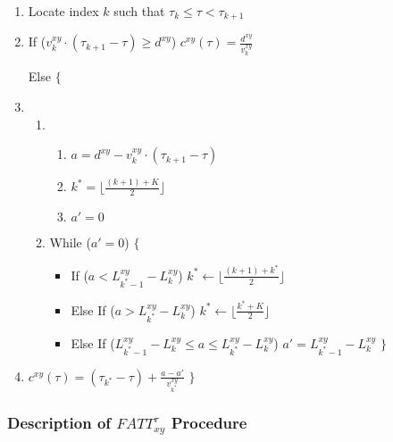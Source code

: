\documentclass[conference]{IEEEtran}
\begin{document}
\begin{enumerate}
    \item Locate index $k$ such that $\tau_k \leq \tau < \tau_{k+1}$ \label{fattindex}
    \item If ($v_k^{xy}\cdot(\tau_{k+1}-\tau)\geq d^{xy}$) $c^{xy}(\tau)=\frac{d^{xy}}{v_k^{xy}}$

    Else $\{$
    \item
    \begin{enumerate}
        \item 
        \begin{enumerate}
            \item $a=d^{xy}-v_k^{xy}\cdot(\tau_{k+1}-\tau)$
            \item $k^*= \lfloor \frac{(k+1)+K}{2} \rfloor$
            \item $a'=0$
        \end{enumerate} 
        \item While ($a'=0$) $\{$  \label{fattwhile}
        \begin{itemize}
            \item If ($a< L_{k^*-1}^{xy}-L_{k}^{xy}$) $k^*\leftarrow \lfloor \frac{(k+1)+k^*}{2} \rfloor $
            \item Else If ($a> L_{k^*}^{xy}-L_{k}^{xy}$) $k^*\leftarrow \lfloor \frac{k^*+K}{2} \rfloor $
            \item Else If ($L_{k^*-1}^{xy}-L_{k}^{xy}\leq a \leq L_{k^*}^{xy}-L_{k}^{xy}$) $a'=L_{k^*-1}^{xy}-L_{k}^{xy}$ $\}$
        \end{itemize}
    \end{enumerate}
    \item $c^{xy}(\tau)=(\tau_{k^*}-\tau)+\frac{a-a'}{v_{k^*}^{xy}}$ $\}$
\end{enumerate}

\subsubsection{Description of $FATT^\tau_{xy}$ Procedure}
\end{document}
